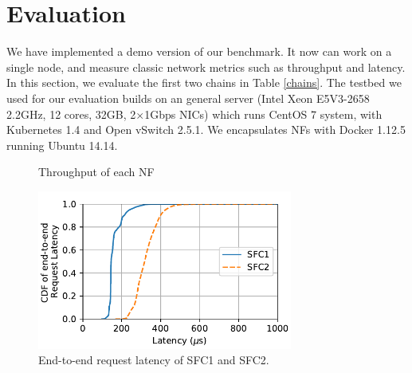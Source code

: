 \section{Evaluation}
We have implemented a demo version of our benchmark.
It now can work on a single node,
and measure classic network metrics such as throughput and latency.
In this section, we evaluate the first two chains in Table \ref{chains}. 
The testbed we used for our evaluation builds on an general server (Intel Xeon E5V3-2658 2.2GHz, 12 cores, 32GB, 2$\times$1Gbps NICs) which runs CentOS 7 system, with Kubernetes 1.4 and Open vSwitch 2.5.1. We encapsulates NFs with Docker 1.12.5 running Ubuntu 14.14. 


%

\begin{figure}[!t]
\centering
{}
\hfil
{}
\hfil
\caption{Throughput of each NF}
\label{throughput}
\end{figure}


\begin{figure}[t]
\centering
\includegraphics[width=3.3in]{fig/e2e_latency_chain12.pdf}
\caption{End-to-end request latency of SFC1 and SFC2.}
\label{e2e_latency}
\end{figure}


